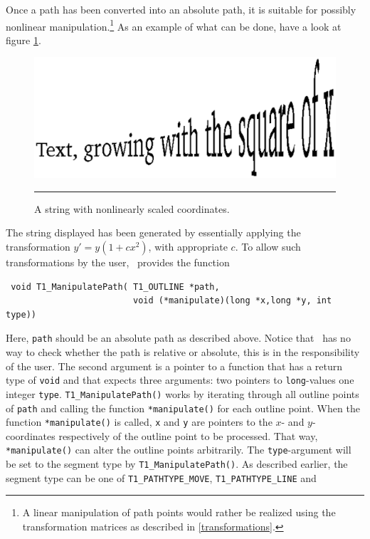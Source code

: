 Once a path has been converted into an absolute path, it is
suitable for possibly nonlinear manipulation.\footnote{A linear manipulation
  of path points would rather be realized using the transformation matrices as
  described in \ref{transformations}.}
As an example of what can be done, have a look at figure \ref{figure:manipulation}. 
\begin{figure}[t]
\hfill
\includegraphics[scale=1.0]{manipulate.eps}
\hfill\break
\vskip3mm
\hrule\vskip3mm\small
\caption{\label{figure:manipulation}A string with nonlinearly scaled coordinates.} 
\end{figure}
The string displayed has been generated by essentially applying the
transformation $y'= y(1+cx^2)$, with appropriate $c$. To allow such
transformations by the user, \tonelib\ provides the function
\precorr
\begin{verbatim}
 void T1_ManipulatePath( T1_OUTLINE *path,
                         void (*manipulate)(long *x,long *y, int type))
\end{verbatim}\postcorr
Here, \verb+path+ should be an absolute path as described above. Notice that
\tonelib\ has no way to check whether the path is relative or absolute, this
is in the responsibility of the user. The second argument is a pointer to a
function that has a return type of \verb+void+ and that expects three
arguments: two pointers to \verb+long+-values one integer \verb+type+.
\verb+T1_ManipulatePath()+ works by iterating through all outline points of
\verb+path+ and calling the function \verb+*manipulate()+ for each outline
point. When the function \verb+*manipulate()+ is called, \verb+x+ and \verb+y+
are pointers to the $x$- and $y$-coordinates respectively of the outline point
to be processed. That way, \verb+*manipulate()+ can alter the outline
points arbitrarily. The \verb+type+-argument will be set to the segment type
by \verb+T1_ManipulatePath()+. As described earlier, the segment type can be
one of \verb+T1_PATHTYPE_MOVE+, \verb+T1_PATHTYPE_LINE+ and
